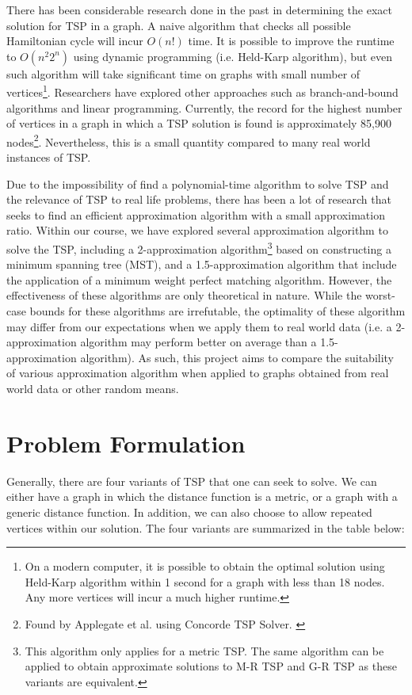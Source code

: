 \documentclass[paper=a4, fontsize=11pt]{scrartcl}	%
\numberwithin{equation}{section}		%
\numberwithin{figure}{section}			%
\numberwithin{table}{section}				%
\begin{document}
There has been considerable research done in the past in determining the exact solution for TSP in a graph. A naive algorithm that checks all possible Hamiltonian cycle will incur $O(n!)$ time. It is possible to improve the runtime to $O(n^{2}2^n)$ using dynamic programming (i.e. Held-Karp algorithm), but even such algorithm will take significant time on graphs with small number of vertices\footnote{On a modern computer, it is possible to obtain the optimal solution using Held-Karp algorithm within 1 second for a graph with less than 18 nodes. \cite{steven} Any more vertices will incur a much higher runtime.}. Researchers have explored other approaches such as branch-and-bound algorithms and linear programming. Currently, the record for the highest number of vertices in a graph in which a TSP solution is found is approximately 85,900 nodes\footnote{Found by Applegate et al. using Concorde TSP Solver. \cite{appleman}}. Nevertheless, this is a small quantity compared to many real world instances of TSP.

Due to the impossibility of find a polynomial-time algorithm to solve TSP and the relevance of TSP to real life problems, there has been a lot of research that seeks to find an efficient approximation algorithm with a small approximation ratio. Within our course, we have explored several approximation algorithm to solve the TSP, including a 2-approximation algorithm\footnote{This algorithm only applies for a metric TSP. The same algorithm can be applied to obtain approximate solutions to M-R TSP and G-R TSP as these variants are equivalent.} based on constructing a minimum spanning tree (MST), and a 1.5-approximation algorithm that include the application of a minimum weight perfect matching algorithm. However, the effectiveness of these algorithms are only theoretical in nature. While the worst-case bounds for these algorithms are irrefutable, the optimality of these algorithm may differ from our expectations when we apply them to real world data (i.e. a 2-approximation algorithm may perform better on average than a 1.5-approximation algorithm). As such, this project aims to compare the suitability of various approximation algorithm when applied to graphs obtained from real world data or other random means. 

\section{Problem Formulation}

Generally, there are four variants of TSP that one can seek to solve. We can either have a graph in which the distance function is a metric, or a graph with a generic distance function. In addition, we can also choose to allow repeated vertices within our solution. The four variants are summarized in the table below:
\end{document}
